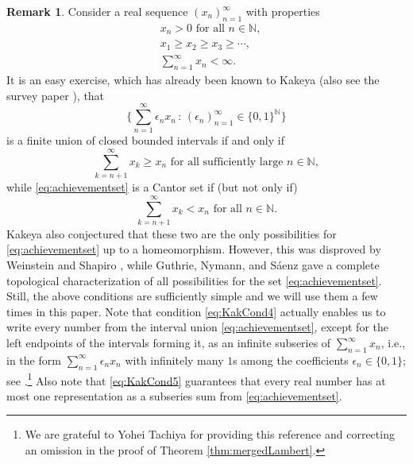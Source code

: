 \documentclass[11pt,letterpaper,reqno]{amsart}
\numberwithin{equation}{section}
\theoremstyle{definition}
\newtheorem{remark}[theorem]{Remark}
\numberwithin{equation}{section}
\begin{document}
\begin{remark}\label{rem:Kakeya}
Consider a real sequence $(x_n)_{n=1}^{\infty}$ with properties
{\allowdisplaybreaks
\begin{subequations}
\begin{align}
& x_n > 0 \text{ for all } n\in\mathbb{N}, \label{eq:KakCond1} \\
& x_1 \geqslant x_2 \geqslant x_3 \geqslant \cdots, \label{eq:KakCond2} \\
& \sum_{n=1}^{\infty} x_n < \infty. \label{eq:KakCond3}
\end{align}
\end{subequations}
}
It is an easy exercise, which has already been known to Kakeya \cite{Kak14a,Kak14b} (also see the survey paper \cite{BFP13}), that
\begin{equation}\label{eq:achievementset}
\biggl\{ \sum_{n=1}^{\infty} \epsilon_n x_n \,:\, (\epsilon_n)_{n=1}^{\infty}\in\{0,1\}^{\mathbb{N}} \biggr\}
\end{equation}
is a finite union of closed bounded intervals if and only if
\begin{equation}\label{eq:KakCond4}
\sum_{k=n+1}^{\infty} x_k \geqslant x_n \text{ for all sufficiently large } n\in\mathbb{N},
\end{equation}
while \eqref{eq:achievementset} is a Cantor set if (but not only if)
\begin{equation}\label{eq:KakCond5}
\sum_{k=n+1}^{\infty} x_k < x_n \text{ for all } n\in\mathbb{N}.
\end{equation}
Kakeya also conjectured that these two are the only possibilities for \eqref{eq:achievementset} up to a homeomorphism.
However, this was disproved by Weinstein and Shapiro \cite{WS80}, while Guthrie, Nymann, and S\'{a}enz \cite{GN88,NS00} gave a complete topological characterization of all possibilities for the set \eqref{eq:achievementset}.
Still, the above conditions are sufficiently simple and we will use them a few times in this paper.
Note that condition \eqref{eq:KakCond4} actually enables us to write every number from the interval union \eqref{eq:achievementset}, except for the left endpoints of the intervals forming it, as an infinite subseries of $\sum_{n=1}^{\infty}x_n$, i.e., in the form $\sum_{n=1}^{\infty} \epsilon_n x_n$ with infinitely many $1$s among the coefficients $\epsilon_n\in\{0,1\}$; see \cite[Problem~131, p.~29]{PS98}.\footnote{We are grateful to Yohei Tachiya for providing this reference and correcting an omission in the proof of Theorem \ref{thm:mergedLambert}.}
Also note that \eqref{eq:KakCond5} guarantees that every real number has at most one representation as a subseries sum from \eqref{eq:achievementset}.
\end{remark}
\end{document}
